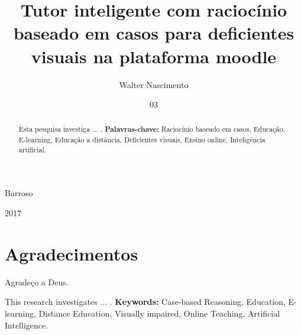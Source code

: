 \documentclass[mscexam,pdftex]{ppgi-ufam}
\begin{document}
\title{Tutor inteligente com raciocínio baseado em casos para deficientes visuais na plataforma moodle}
\author{Walter Nascimento}{Barroso}
\date{03}{2017}


\maketitle


\dedication{A Deus, \\ aos professores, \\ aos colegas de curso e \\ aos meus familiares.}

\chapter*{Agradecimentos}
Agradeço a Deus.


\begin{abstract}
Esta pesquisa investiga ... .
\linebreak
\linebreak
\textbf{Palavras-chave:} Raciocínio baseado em casos, Educação, E-learning, Educação a distância, Deficientes visuais, Ensino online, Inteligência artificial.
\end{abstract}

\begin{foreignabstract}
This research investigates ... .
\linebreak
\linebreak
\textbf{Keywords:} Case-based Reasoning, Education, E-learning, Distance Education, Visually impaired, Online Teaching, Artificial Intelligence.
\end{foreignabstract}

\setcounter{tocdepth}{1}

\tableofcontents
\listoffigures
\listoftables
    
\mainmatter










\label{bib:begin}

\label{bib:end}
\end{document}
